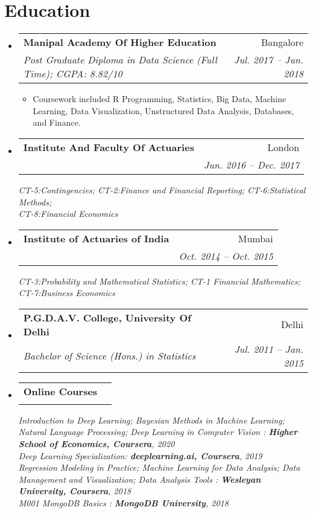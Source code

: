 \documentclass[letterpaper,11pt]{article}
\makeatletter
\newcommand{\textItem}[1]{
  \item\small{
    {#1 \vspace{-2pt}}
  }
}
\newcommand{\resumeSubheading}[4]{
  \vspace{-1pt}\item
    \begin{tabular*}{0.97\textwidth}[t]{l@{\extracolsep{\fill}}r}
      \textbf{#1} & #2 \\
      \textit{\small#3} & \textit{\small #4} \\
    \end{tabular*}\vspace{-5pt}
}
\newcommand{\resumeSubHeadingListStart}{\begin{itemize}[leftmargin=*]}
\newcommand{\resumeSubHeadingListEnd}{\end{itemize}}
\newcommand{\resumeItemListStart}{\begin{itemize}}
\newcommand{\resumeItemListEnd}{\end{itemize}\vspace{-5pt}}
\makeatother
\begin{document}
\section{Education}
  \resumeSubHeadingListStart
    \resumeSubheading
      {Manipal Academy Of Higher Education}{Bangalore}
      {Post Graduate Diploma in Data Science (Full Time);  CGPA: 8.82/10}{Jul. 2017 -- Jun. 2018}
      \resumeItemListStart
      	\textItem{Coursework included R Programming, Statistics, Big Data, Machine Learning, Data Visualization, Unstructured Data Analysis, Databases, and Finance.}
      \resumeItemListEnd	
    \resumeSubheading
      {Institute And Faculty Of Actuaries}{London}{}{Jun. 2016 -- Dec. 2017\vspace{-7pt}}
      \textit{\small CT-5:Contingencies; CT-2:Finance and Financial Reporting; CT-6:Statistical Methods;}\\
      \textit{\small CT-8:Financial Economics}  
    \resumeSubheading
      {Institute of Actuaries of India}{Mumbai}{}{Oct. 2014 -- Oct. 2015\vspace{-7pt}}
      \textit{\small CT-3:Probability and Mathematical Statistics; CT-1 Financial Mathematics;}\\
      \textit{\small CT-7:Business Economics} 
	\resumeSubheading
	  {P.G.D.A.V. College, University Of Delhi}{Delhi}
	  {Bachelor of Science (Hons.) in Statistics}{Jul. 2011 -- Jan. 2015}
	\resumeSubheading
	  {Online Courses}{}{}{}
	  \textit{\small Introduction to Deep Learning; Bayesian Methods in Machine Learning; Natural Language Processing; Deep Learning in Computer Vision : \textbf{Higher School of Economics, Coursera}, 2020}\\
	  \textit{\small Deep Learning Specialization: \textbf{deeplearning.ai, Coursera}, 2019}\\
	  \textit{\small Regression Modeling in Practice; Machine Learning for Data Analysis; Data Management and Visualization; Data Analysis Tools : \textbf{Wesleyan University, Coursera}, 2018}\\
	  \textit{\small M001 MongoDB Basics : \textbf{MongoDB University}, 2018}	      
  \resumeSubHeadingListEnd
  

\end{document}
